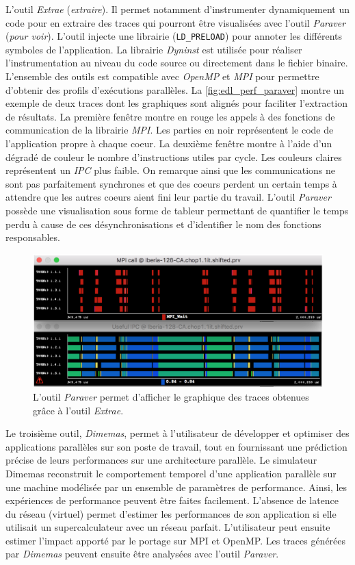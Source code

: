             L'outil \textit{Extrae} (\textit{extraire}). Il permet notamment d'instrumenter dynamiquement un code pour en extraire des traces qui pourront être visualisées avec l'outil \textit{Paraver} (\textit{pour voir}). L'outil injecte une librairie (\verb=LD_PRELOAD=) pour annoter les différents symboles de l'application. La librairie \textit{Dyninst} est utilisée pour réaliser l'instrumentation au niveau du code source ou directement dans le fichier binaire. L'ensemble des outils est compatible avec \textit{OpenMP} et \textit{MPI} pour permettre d'obtenir des profils d'exécutions parallèles. La \autoref{fig:edl_perf_paraver} montre un exemple de deux traces dont les graphiques sont alignés pour faciliter l'extraction de résultats. La première fenêtre montre en rouge les appels à des fonctions de communication de la librairie \textit{MPI}. Les parties en noir représentent le code de l'application propre à chaque coeur. La deuxième fenêtre montre à l'aide d'un dégradé de couleur le nombre d'instructions utiles par cycle. Les couleurs claires représentent un \textit{IPC} plus faible. On remarque ainsi que les communications ne sont pas parfaitement synchrones et que des coeurs perdent un certain temps à attendre que les autres coeurs aient fini leur partie du travail. L'outil \textit{Paraver} possède une visualisation sous forme de tableur permettant de quantifier le temps perdu à cause de ces désynchronisations et d'identifier le nom des fonctions responsables.  
        
            \begin{figure}
            \center
            \includegraphics[width=12cm]{images/edl_perf_paraver.png}
            \caption{\label{fig:edl_perf_paraver} L'outil \textit{Paraver} permet d'afficher le graphique des traces obtenues grâce à l'outil \textit{Extrae}.}
            \end{figure}
            
            Le troisième outil, \textit{Dimemas}, permet à l'utilisateur de développer et optimiser des applications parallèles sur son poste de travail, tout en fournissant une prédiction précise de leurs performances sur une architecture parallèle. Le simulateur Dimemas reconstruit le comportement temporel d'une application parallèle sur une machine modélisée par un ensemble de paramètres de performance. Ainsi, les expériences de performance peuvent être faites facilement. L'absence de latence du réseau (virtuel) permet d'estimer les performances de son application si elle utilisait un supercalculateur avec un réseau parfait. L'utilisateur peut ensuite estimer l'impact apporté par le portage sur MPI et OpenMP. Les traces générées par \textit{Dimemas} peuvent ensuite être analysées avec l'outil \textit{Paraver}.


